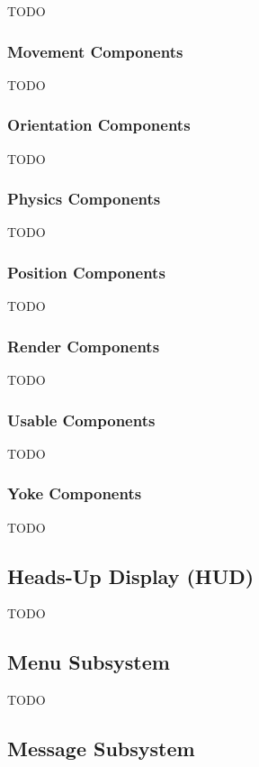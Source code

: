 TODO

\subsubsection{Movement Components}

TODO

\subsubsection{Orientation Components}

TODO

\subsubsection{Physics Components}

TODO

\subsubsection{Position Components}

TODO

\subsubsection{Render Components}

TODO

\subsubsection{Usable Components}

TODO

\subsubsection{Yoke Components}

TODO

\subsection{Heads-Up Display (HUD)}

TODO

\subsection{Menu Subsystem}

TODO

\subsection{Message Subsystem}

